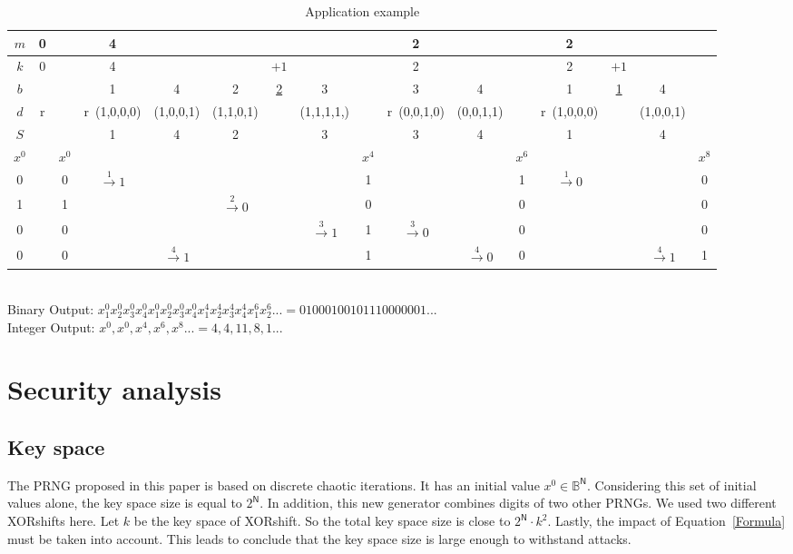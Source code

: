 \documentclass[10pt, a4paper, conference, compsocconf]{IEEEtran}
\begin{document}
\begin{tiny}
\begin{table*}[!t]
\centering
\begin{tabular}{|c|cc|cccccc|ccc|cccc|}
\hline
$m$ &0 & &4 & & & & & &2& &&2&&  &  \\ \hline
$k$ &0 & &4 & & &$+1$ & & &2& &&2&$+1$&  &  \\ \hline
$b$  &  & &1 &4&2&\underline{2}       &3& &3&4&&1&\underline{1}      &4&\\ \hline
$d$  &r  & &r~(1,0,0,0)&(1,0,0,1) &(1,1,0,1)& &(1,1,1,1,)&&r~(0,0,1,0) &(0,0,1,1) &&r~(1,0,0,0) & &(1,0,0,1)  &  \\ \hline
$S$  &  & &1 &4&2&        &3& &3&4&&1& &4 &  \\ \hline
$x^{0}$ &  &$x^{0}$ & & &  
&  & &$x^{4}$ & & &   
$x^{6}$& & &&$x^{8}$  \\
0 & &0 &$\xrightarrow{1} 1$ & &
 & &   &1   & & &
1 &$\xrightarrow{1} 0$ & & & 0\\
1 &  &1 &   &   &
$\xrightarrow{2} 0$ & & &0 & & &
0 & &  &&0\\
0 & &0 & & &
 & &$\xrightarrow{3} 1$ &1 &$\xrightarrow{3} 0$ & &
0 &   & & &0  \\
0 & &0  & &$\xrightarrow{4} 1$ &
 & & &1 & &$\xrightarrow{4} 0$ &
0 & & &$\xrightarrow{4} 1$&1 \\
\hline
\end{tabular}\\
\vspace{0.5cm}
Binary Output: $x_1^{0}x_2^{0}x_3^{0}x_4^{0}x_1^{0}x_2^{0}x_3^{0}x_4^{0}x_1^{4}x_2^{4}x_3^{4}x_4^{4}x_1^{6}x_2^{6}... = 01000100101110000001...$\\
Integer Output:
$x^{0},x^{0},x^{4},x^{6},x^{8}... = 4,4,11,8,1...$
\caption{Application example}
\label{table application example}
\end{table*}
\end{tiny}



\section{Security analysis}
\label{Security analysis}
\subsection{Key space}
The PRNG proposed in this paper is based on discrete chaotic iterations. It has an initial 
value $x^0\in \mathds{B}^{\mathsf{N}}$. Considering this set of initial values alone, the key space size 
is equal to $2^\mathsf{N}$. In addition, this new generator combines digits of two other PRNGs. We used two different XORshifts here. Let $k$ be the key space of XORshift. So the total key space 
size is close to $2^\mathsf{N}\cdot k^2$. Lastly, the impact of Equation~\ref{Formula} must be 
taken into account.
This leads to conclude that the key space size is large enough to withstand 
attacks.
\end{document}
